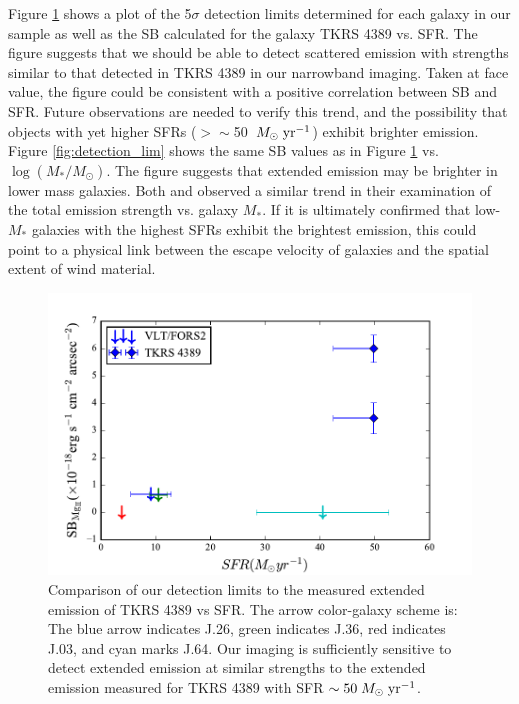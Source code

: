 \documentclass[twocolumn]{aastex61}
\def \msunperyr {{\; M_{\odot}\rm \;yr^{-1}}}
\begin{document}
Figure \ref{fig:SFR_lim} shows a plot of the 5$\sigma$ detection limits determined for each galaxy in our sample as well as the SB calculated for the galaxy TKRS 4389 vs. SFR. The figure suggests that we should be able to detect scattered  emission with strengths similar to that detected in TKRS 4389 in our narrowband imaging. Taken at face value, the figure could be consistent with a positive correlation between  SB and SFR. Future observations are needed to verify this trend, and the possibility that objects with yet higher SFRs ($>\sim$50 $\msunperyr$) exhibit brighter  emission.
Figure \ref{fig:detection_lim} shows the same SB values as in Figure \ref{fig:SFR_lim} vs. $\log(M_*/M_{\odot})$. The figure suggests that extended  emission may be brighter in lower mass galaxies.  Both \cite{Erb2012} and \cite{Feltre2018} observed a similar trend in their examination of the total  emission strength vs. galaxy $M_*$.  If it is ultimately confirmed that low-$M_*$ galaxies with the highest SFRs exhibit the brightest emission, this could point to a physical link between the escape velocity of galaxies and the spatial extent of wind material.

\begin{figure}[!htb]
\centering
\includegraphics[scale=0.6]{../Figures/limits.pdf}
\caption{Comparison of our detection limits to the measured extended emission of TKRS 4389 vs SFR. The arrow color-galaxy scheme is: The blue arrow indicates J.26, green indicates J.36, red indicates J.03, and cyan marks J.64. Our imaging is sufficiently sensitive to detect extended emission at similar strengths to the extended emission measured for TKRS 4389 with SFR $\sim 50 \msunperyr$.}
\label{fig:SFR_lim}
\end{figure}
\end{document}
